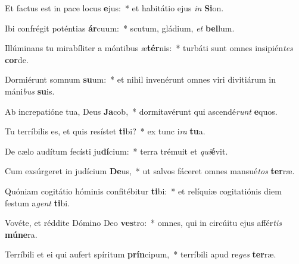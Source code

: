 \item Et factus est in pace locus \textbf{e}jus:~* et habitátio ejus \textit{in} \textbf{Si}on.
\item Ibi confrégit poténtias \textbf{ár}cuum:~* scutum, gládium, \textit{et} \textbf{bel}lum.
\item Illúminans tu mirabíliter a móntibus æ\textbf{tér}nis:~* turbáti sunt omnes insipién\textit{tes} \textbf{cor}de.
\item Dormiérunt somnum \textbf{su}um:~* et nihil invenérunt omnes viri divitiárum in máni\textit{bus} \textbf{su}is.
\item Ab increpatióne tua, Deus \textbf{Ja}cob,~* dormitavérunt qui ascendé\textit{runt} \textbf{e}quos.
\item Tu terríbilis es, et quis resístet \textbf{ti}bi?~* ex tunc i\textit{ra} \textbf{tu}a.
\item De cælo audítum fecísti ju\textbf{dí}cium:~* terra trémuit et \textit{qui}\textbf{é}vit.
\item Cum exsúrgeret in judícium \textbf{De}us,~* ut salvos fáceret omnes mansué\textit{tos} \textbf{ter}ræ.
\item Quóniam cogitátio hóminis confitébitur \textbf{ti}bi:~* et relíquiæ cogitatiónis diem festum a\textit{gent} \textbf{ti}bi.
\item Vovéte, et réddite Dómino Deo \textbf{ves}tro:~* omnes, qui in circúitu ejus affér\textit{tis} \textbf{mú}\textbf{ne}ra.
\item Terríbili et ei qui aufert spíritum \textbf{prín}cipum,~* terríbili apud re\textit{ges} \textbf{ter}ræ.

